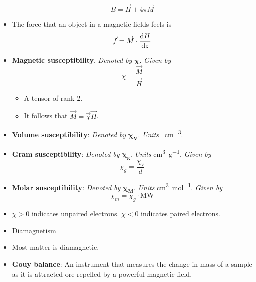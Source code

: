 \documentclass[../notes.tex]{subfiles}
\begin{document}
\begin{itemize}
    \begin{equation*}
        B = \vec{H}+4\pi\vec{M}
    \end{equation*}
    \item The force that an object in a magnetic fields feels is
    \begin{equation*}
        \vec{f} = \vec{M}\cdot\dv{H}{z}
    \end{equation*}
    \item \textbf{Magnetic susceptibility}. \emph{Denoted by} $\bm{\chi}$. \emph{Given by}
    \begin{equation*}
        \chi = \frac{\vec{M}}{\vec{H}}
    \end{equation*}
    \begin{itemize}
        \item A tensor of rank 2.
        \item It follows that $\vec{M}=\vec{\chi}\vec{H}$.
    \end{itemize}
    \item \textbf{Volume susceptibility}: \emph{Denoted by} $\bm{\chi_V}$. \emph{Units} \si{\electromagneticunits\per\cubic\centi\meter}.
    \item \textbf{Gram susceptibility}: \emph{Denoted by} $\bm{\chi_g}$. \emph{Units} \si{\cubic\centi\meter\per\gram}. \emph{Given by}
    \begin{equation*}
        \chi_g = \frac{\chi_V}{d}
    \end{equation*}
    \item \textbf{Molar susceptibility}: \emph{Denoted by} $\bm{\chi_M}$. \emph{Units} \si{\cubic\centi\meter\per\mole}. \emph{Given by}
    \begin{equation*}
        \chi_m = \chi_g\cdot\text{MW}
    \end{equation*}
    \item $\chi>0$ indicates unpaired electrons. $\chi<0$ indicates paired electrons.
    \item Diamagnetism
    \item Most matter is diamagnetic.
    \item \textbf{Gouy balance}: An instrument that measures the change in mass of a sample as it is attracted ore repelled by a powerful magnetic field.
    \begin{figure}[h!]
        \centering
\end{figure}
\end{itemize}
\end{document}

